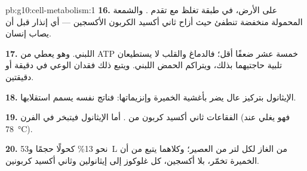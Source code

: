 \begin{solution}{pb:g10:cell-metabolism:1}
\textbf{16.} على الأرض، في طبقة تغلظ مع تقدم . والشمعة المحمولة
منخفضة تنطفئ حيث أزاح ثاني أكسيد الكربون الأكسجين --- أي إنذار قبل أن
يصاب إنسان.

\textbf{17.}  اللبني. وهو يعطي من ATP خمسة عشر ضعفًا أقل؛
فالدماغ والقلب لا يستطيعان تلبية حاجتيهما بذلك، ويتراكم الحمض اللبني.
ويتبع ذلك فقدان الوعي في دقيقة أو دقيقتين.

\textbf{18.} الإيثانول بتركيز عال يضر بأغشية الخميرة وإنزيماتها:
فناتج  نفسه يسمم استقلابها.

\textbf{19.} الفقاعات ثاني أكسيد كربون من . أما الإيثانول
فيتبخر في الفرن (فهو يغلي عند \qty{78}{\celsius}).

\textbf{20.} نحو 13\% كحولًا حجمًا و\qty{53}{L} من الغاز لكل لتر من
العصير؛ وكلاهما يتبع من أن الخميرة تخمّر، بلا أكسجين، كل غلوكوز إلى
إيثانولين وثاني أكسيد كربونين.
\end{solution}
